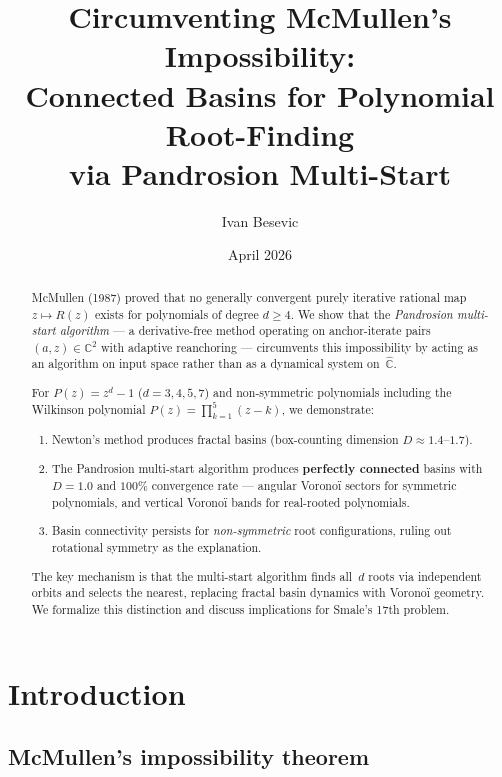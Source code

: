\documentclass[11pt,a4paper]{article}
\title{Circumventing McMullen's Impossibility:\\Connected Basins for Polynomial Root-Finding\\via Pandrosion Multi-Start}
\author{Ivan Besevic}
\date{April 2026}
\theoremstyle{definition}
\theoremstyle{remark}
\begin{document}
\maketitle

\begin{abstract}
McMullen (1987) proved that no generally convergent purely iterative rational map $z \mapsto R(z)$ exists for polynomials of degree $d \geq 4$.  
We show that the \emph{Pandrosion multi-start algorithm} --- a derivative-free method operating on anchor-iterate pairs $(a, z) \in \mathbb{C}^2$ with adaptive reanchoring --- circumvents this impossibility by acting as an algorithm on input space rather than as a dynamical system on~$\hat{\mathbb{C}}$.

For $P(z) = z^d - 1$ ($d = 3, 4, 5, 7$) and non-symmetric polynomials including the Wilkinson polynomial $P(z) = \prod_{k=1}^5 (z-k)$, we demonstrate:
\begin{enumerate}[nosep]
\item Newton's method produces fractal basins (box-counting dimension $D \approx 1.4$--$1.7$).
\item The Pandrosion multi-start algorithm produces \textbf{perfectly connected} basins with $D = 1.0$ and $100\%$ convergence rate --- angular Vorono\"i sectors for symmetric polynomials, and vertical Vorono\"i bands for real-rooted polynomials.
\item Basin connectivity persists for \emph{non-symmetric} root configurations, ruling out rotational symmetry as the explanation.
\end{enumerate}
The key mechanism is that the multi-start algorithm finds all~$d$ roots via independent orbits and selects the nearest, replacing fractal basin dynamics with Vorono\"i geometry.  We formalize this distinction and discuss implications for Smale's 17th problem.
\end{abstract}

\tableofcontents

\section{Introduction}

\subsection{McMullen's impossibility theorem}
\end{document}
